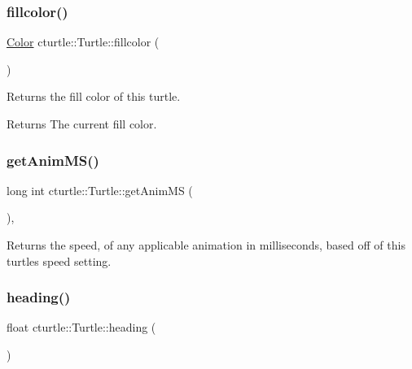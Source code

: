 \subsubsection{\texorpdfstring{fillcolor()}{fillcolor()}\hspace{0.1cm}{\footnotesize\ttfamily [2/2]}}
{\footnotesize\ttfamily \hyperlink{classcturtle_1_1Color}{Color} cturtle\+::\+Turtle\+::fillcolor (\begin{DoxyParamCaption}{ }\end{DoxyParamCaption})\hspace{0.3cm}{\ttfamily [inline]}}



Returns the fill color of this turtle. 

\begin{DoxyReturn}{Returns}
The current fill color. 
\end{DoxyReturn}
\mbox{\label{classcturtle_1_1Turtle_af567c8c2491fb8dca54d4725f2a6a7a8}} 
\subsubsection{\texorpdfstring{get\+Anim\+M\+S()}{getAnimMS()}}
{\footnotesize\ttfamily long int cturtle\+::\+Turtle\+::get\+Anim\+MS (\begin{DoxyParamCaption}{ }\end{DoxyParamCaption})\hspace{0.3cm}{\ttfamily [inline]}, {\ttfamily [protected]}}

Returns the speed, of any applicable animation in milliseconds, based off of this turtle\textquotesingle{}s speed setting. \mbox{\label{classcturtle_1_1Turtle_a5c90aa6dea03e88f202dcadc4ff77354}} 
\subsubsection{\texorpdfstring{heading()}{heading()}}
{\footnotesize\ttfamily float cturtle\+::\+Turtle\+::heading (\begin{DoxyParamCaption}{ }\end{DoxyParamCaption})\hspace{0.3cm}{\ttfamily [inline]}}

